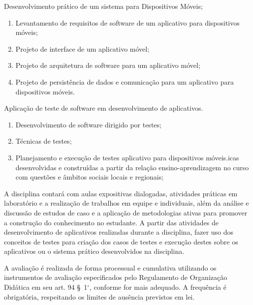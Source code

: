 \begin{pud}
\begin{description}[itemsep=0em]
		\item[UNIDADE VII:] Desenvolvimento prático de um sistema para Dispositivos Móveis; 
	         \begin{enumerate}[itemsep=0em, topsep=0em]
				\item  Levantamento de requisitos de software de um aplicativo para dispositivos móveis;
	            \item  Projeto de interface de um aplicativo móvel;
	            \item  Projeto de arquitetura de software para um aplicativo móvel;
	            \item  Projeto de persistência de dados e comunicação para um aplicativo para dispositivos móveis.
            \end{enumerate}
            
        \item[UNIDADE VIII:] Aplicação de teste de software em desenvolvimento de aplicativos.
	         \begin{enumerate}[itemsep=0em, topsep=0em]
				\item  Desenvolvimento de software dirigido por testes;
				\item Técnicas de testes;
				\item Planejamento e execução de testes aplicativo para dispositivos móveis.icas desenvolvidas e construídas a partir da relação ensino-aprendizagem no curso com questões e âmbitos sociais locais e regionais;
                
            \end{enumerate}                                    

	\end{description}
	
	\metodologia
	A disciplina contará com aulas expositivas dialogadas, atividades práticas em laboratório e a realização de trabalhos em equipe e individuais, além da análise e discussão de estudos de caso e a aplicação de metodologias ativas para promover a construção do conhecimento no estudante. A partir das atividades de desenvolvimento de aplicativos realizadas durante a disciplina, fazer uso dos conceitos de testes para criação dos casos de testes e execução destes sobre os aplicativos ou o sistema prático desenvolvidos na disciplina.
	
	\avaliacao
	A avaliação é realizada de forma processual e cumulativa utilizando os instrumentos de avaliação especificados pelo Regulamento de Organização Didática em seu art. 94 \S~1$^\circ$, conforme for mais adequado. A frequência é obrigatória, respeitando os limites de ausência previstos em lei.
	

\end{pud}
